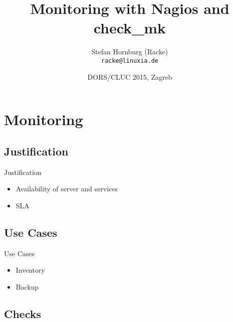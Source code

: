 \usepackage[utf8]{inputenc}
\usepackage[T1]{fontenc}
\usepackage{mathptmx}
\usepackage[scaled=.90]{helvet}
\usepackage{courier}
\usepackage{caption}
\captionsetup{labelformat=empty,labelsep=none}
\usepackage{verbatim}
\usepackage{hyperref}
\usepackage{listings}
\usepackage{ulem}
\lstset{language=Perl,basicstyle=\normalsize,tabsize=3,showstringspaces=false}

\title{Monitoring with Nagios and check\_mk}
\author[racke]{Stefan Hornburg (Racke)\\ \texttt{racke@linuxia.de}}
\date{DORS/CLUC 2015, Zagreb}


\maketitle{}

\begin{frame}
  \titlepage
\end{frame}

\tableofcontents

\section{Monitoring}

\subsection{Justification}

\begin{frame}[fragile]{Justification}
\begin{itemize}
\item Availability of server and services
\item SLA
\end{itemize}
\end{frame}

\subsection{Use Cases}
\begin{frame}[fragile]{Use Cases}
\begin{itemize}
\item Inventory
\item Backup
\end{itemize}
\end{frame}

\subsection{Checks}

